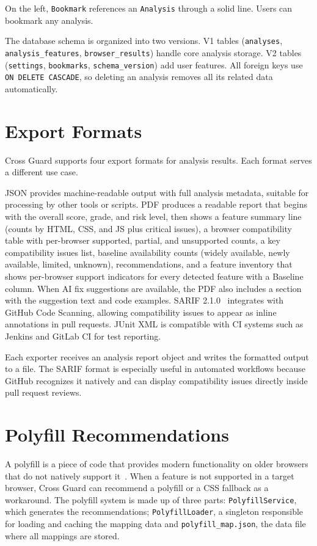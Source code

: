 On the left, \texttt{Bookmark} references an \texttt{Analysis} through a solid line. Users can bookmark any analysis.

The database schema is organized into two versions. V1 tables (\texttt{analyses}, \texttt{analysis\_features}, \texttt{browser\_results}) handle core analysis storage. V2 tables (\texttt{settings}, \texttt{bookmarks}, \texttt{schema\_version}) add user features. All foreign keys use \texttt{ON DELETE CASCADE}, so deleting an analysis removes all its related data automatically.

\section{Export Formats}
\label{sec:export}

Cross Guard supports four export formats for analysis results. Each format serves a different use case.

JSON provides machine-readable output with full analysis metadata, suitable for processing by other tools or scripts. PDF produces a readable report that begins with the overall score, grade, and risk level, then shows a feature summary line (counts by HTML, CSS, and JS plus critical issues), a browser compatibility table with per-browser supported, partial, and unsupported counts, a key compatibility issues list, baseline availability counts (widely available, newly available, limited, unknown), recommendations, and a feature inventory that shows per-browser support indicators for every detected feature with a Baseline column. When AI fix suggestions are available, the PDF also includes a section with the suggestion text and code examples. SARIF 2.1.0~\cite{sarif210} integrates with GitHub Code Scanning, allowing compatibility issues to appear as inline annotations in pull requests. JUnit XML is compatible with CI systems such as Jenkins and GitLab CI for test reporting.

Each exporter receives an analysis report object and writes the formatted output to a file. The SARIF format is especially useful in automated workflows because GitHub recognizes it natively and can display compatibility issues directly inside pull request reviews.

\section{Polyfill Recommendations}
\label{sec:polyfill}

A polyfill is a piece of code that provides modern functionality on older browsers that do not natively support it~\cite{sharp2010polyfill}. When a feature is not supported in a target browser, Cross Guard can recommend a polyfill or a CSS fallback as a workaround. The polyfill system is made up of three parts: \texttt{PolyfillService}, which generates the recommendations; \texttt{PolyfillLoader}, a singleton responsible for loading and caching the mapping data and \texttt{polyfill\_map.json}, the data file where all mappings are stored.

